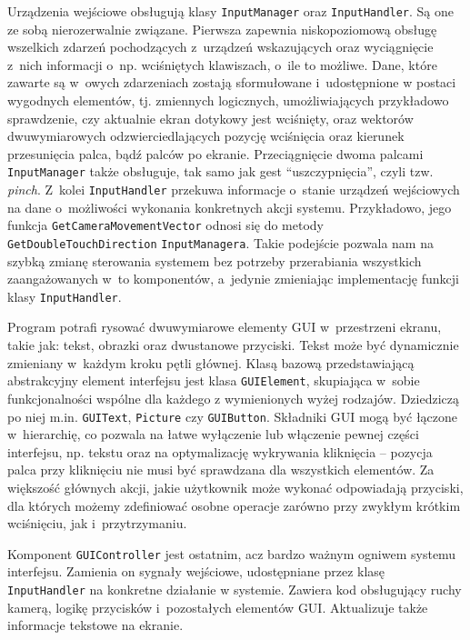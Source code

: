 		Urządzenia wejściowe obsługują klasy \texttt{InputManager} oraz \texttt{InputHandler}. Są one ze sobą nierozerwalnie związane. Pierwsza zapewnia niskopoziomową obsługę wszelkich zdarzeń pochodzących z~urządzeń wskazujących oraz wyciągnięcie z~nich informacji o~np. wciśniętych klawiszach, o~ile to możliwe. Dane, które zawarte są w~owych zdarzeniach zostają sformułowane i~udostępnione w postaci wygodnych elementów, tj. zmiennych logicznych, umożliwiających przykładowo sprawdzenie, czy aktualnie ekran dotykowy jest wciśnięty, oraz wektorów dwuwymiarowych odzwierciedlających pozycję wciśnięcia oraz kierunek przesunięcia palca, bądź palców po ekranie. Przeciągnięcie dwoma palcami \texttt{InputManager} także obsługuje, tak samo jak gest ``uszczypnięcia'', czyli tzw. \emph{pinch}. Z~kolei \texttt{InputHandler} przekuwa informacje o~stanie urządzeń wejściowych na dane o~możliwości wykonania konkretnych akcji systemu. Przykładowo, jego funkcja \texttt{GetCameraMovementVector} odnosi się do metody \texttt{GetDoubleTouchDirection} \texttt{InputManagera}. Takie podejście pozwala nam na szybką zmianę sterowania systemem bez potrzeby przerabiania wszystkich zaangażowanych w~to komponentów, a~jedynie zmieniając implementację funkcji klasy \texttt{InputHandler}. 
		
		Program potrafi rysować dwuwymiarowe elementy GUI w~przestrzeni ekranu, takie jak: tekst, obrazki oraz dwustanowe przyciski.
		Tekst może być dynamicznie zmieniany w~każdym kroku pętli głównej. Klasą bazową przedstawiającą abstrakcyjny element interfejsu jest klasa \texttt{GUIElement}, skupiająca w~sobie funkcjonalności wspólne dla każdego z wymienionych wyżej rodzajów. Dziedziczą po niej m.in. \texttt{GUIText}, \texttt{Picture} czy \texttt{GUIButton}. Składniki GUI mogą być łączone w~hierarchię, co pozwala na łatwe wyłączenie lub włączenie pewnej części interfejsu, np. tekstu oraz na optymalizację wykrywania kliknięcia -- pozycja palca przy kliknięciu nie musi być sprawdzana dla wszystkich elementów. Za większość głównych akcji, jakie użytkownik może wykonać odpowiadają przyciski, dla których możemy zdefiniować osobne operacje zarówno przy zwykłym krótkim wciśnięciu, jak i~przytrzymaniu.
		
		Komponent \texttt{GUIController} jest ostatnim, acz bardzo ważnym ogniwem systemu interfejsu. Zamienia on sygnały wejściowe, udostępniane przez klasę \texttt{InputHandler} na konkretne działanie w systemie. Zawiera kod obsługujący ruchy kamerą, logikę przycisków i~pozostałych elementów GUI. Aktualizuje także informacje tekstowe na ekranie. 
		

